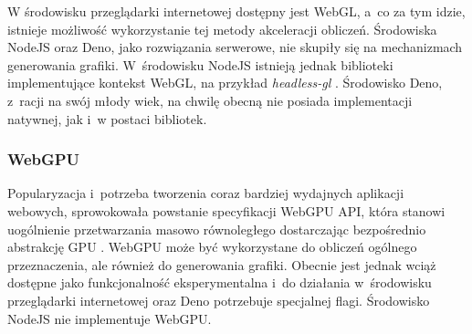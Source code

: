 W środowisku przeglądarki internetowej dostępny jest WebGL, a~co za tym idzie, istnieje możliwość wykorzystanie tej metody akceleracji obliczeń. Środowiska NodeJS oraz Deno, jako rozwiązania serwerowe, nie skupiły się na mechanizmach generowania grafiki. W~środowisku NodeJS istnieją jednak biblioteki implementujące kontekst WebGL, na przykład \textit{headless-gl} \cite{headless-gl}. Środowisko Deno, z~racji na swój młody wiek, na chwilę obecną nie posiada implementacji natywnej, jak i~w postaci bibliotek. 

\subsubsection{WebGPU}

Popularyzacja i~potrzeba tworzenia coraz bardziej wydajnych aplikacji webowych, sprowokowała powstanie specyfikacji WebGPU API, która stanowi uogólnienie przetwarzania masowo równoległego dostarczając bezpośrednio abstrakcję GPU \cite{webgpu_2022}. WebGPU może być wykorzystane do obliczeń ogólnego przeznaczenia, ale również do generowania grafiki. Obecnie jest jednak wciąż dostępne jako funkcjonalność eksperymentalna i~do działania w~środowisku przeglądarki internetowej oraz Deno potrzebuje specjalnej flagi. Środowisko NodeJS nie implementuje \mbox{WebGPU}.
